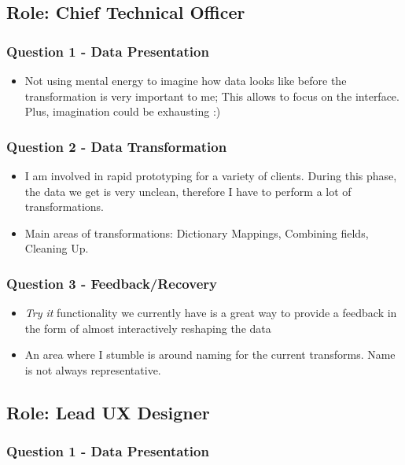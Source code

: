 \documentclass[12pt,letterpaper]{article}
\begin{document}
\subsection*{Role: Chief Technical Officer}
\subsubsection*{Question 1 - Data Presentation}

\begin{itemize}
    \item Not using mental energy to imagine how data looks like before the transformation is very important to me; This allows to focus on the interface. Plus, imagination could be exhausting :)
\end{itemize}

\subsubsection*{Question 2 - Data Transformation}
\begin{itemize}
    \item I am involved in rapid prototyping for a variety of clients. During this phase, the data we get is very unclean, therefore I have to perform a lot of transformations.
    \item Main areas of transformations: Dictionary Mappings, Combining fields, Cleaning Up.
\end{itemize}

\subsubsection*{Question 3 - Feedback/Recovery}
\begin{itemize}
    \item \textit{Try it} functionality we currently have is a great way to provide a feedback in the form of almost interactively reshaping the data
    \item An area where I stumble is around naming for the current transforms. Name is not always representative.
\end{itemize}

\subsection*{Role: Lead UX Designer}
\subsubsection*{Question 1 - Data Presentation}
\end{document}
